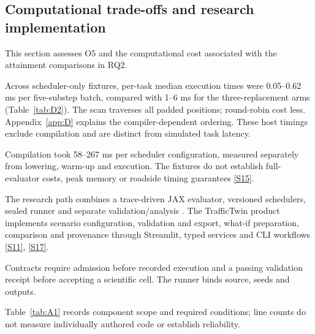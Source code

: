 \documentclass[12pt,a4paper]{article}
\begin{document}
\FloatBarrier
\subsection{Computational trade-offs and research implementation}\label{sec:3.7}

This section assesses O5 and the computational cost associated with the attainment comparisons in RQ2.

Across scheduler-only fixtures, per-task median execution times were 0.05--0.62 ms per five-substep batch, compared with 1--6 ms for the three-replacement arms (Table~\ref{tab:D2}). The scan traverses all padded positions; round-robin cost less. Appendix~\ref{app:D} explains the compiler-dependent ordering. These host timings exclude compilation and are distinct from simulated task latency.





Compilation took 58--267 ms per scheduler configuration, measured separately from lowering, warm-up and execution. The fixtures do not establish full-evaluator costs, peak memory or roadside timing guarantees \hyperref[source-s15]{[S15]}.

The research path combines a trace-driven JAX evaluator, versioned schedulers, sealed runner and separate validation/analysis \cite{ref36}. The TrafficTwin product implements scenario configuration, validation and export, what-if preparation, comparison and provenance through Streamlit, typed services and CLI workflows \hyperref[source-s11]{[S11]}, \hyperref[source-s17]{[S17]}.

Contracts require admission before recorded execution and a passing validation receipt before accepting a scientific cell. The runner binds source, seeds and outputs.

Table~\ref{tab:A1} records component scope and required conditions; line counts do not measure individually authored code or establish reliability.
\end{document}
